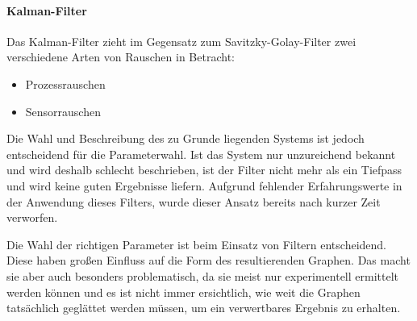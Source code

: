 \paragraph{Kalman-Filter}
Das Kalman-Filter zieht im Gegensatz zum Savitzky-Golay-Filter zwei verschiedene Arten von Rauschen in Betracht:
\begin{itemize}
\item Prozessrauschen 
\item Sensorrauschen
\end{itemize}
Die Wahl und Beschreibung des zu Grunde liegenden Systems ist jedoch entscheidend für die Parameterwahl. Ist das System nur unzureichend bekannt und wird deshalb schlecht beschrieben, ist der Filter nicht mehr als ein Tiefpass und wird keine guten Ergebnisse liefern. Aufgrund fehlender Erfahrungswerte in der Anwendung dieses Filters, wurde dieser Ansatz bereits nach kurzer Zeit verworfen.

Die Wahl der richtigen Parameter ist beim Einsatz von Filtern entscheidend. Diese haben großen Einfluss auf die Form des resultierenden Graphen. Das macht sie aber auch besonders problematisch, da sie meist nur experimentell ermittelt werden können und es ist nicht immer ersichtlich, wie weit die Graphen tatsächlich geglättet werden müssen, um ein verwertbares Ergebnis zu erhalten. 